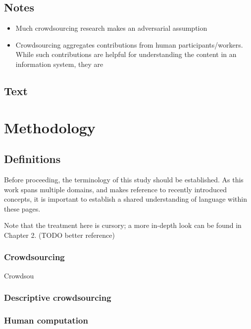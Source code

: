 \subsection{Notes}\label{notes-2}

\begin{itemize}
\item
  Much crowdsourcing research makes an adversarial assumption
\item
  Crowdsourcing aggregates contributions from human
  participants/workers. While such contributions are helpful for
  understanding the content in an information system, they are
\end{itemize}

\subsection{Text}\label{text}

\section{Methodology}\label{methodology}

\subsection{Definitions}\label{definitions}

Before proceeding, the terminology of this study should be established.
As this work spans multiple domains, and makes reference to recently
introduced concepts, it is important to establish a shared understanding
of language within these pages.

Note that the treatment here is cursory; a more in-depth look can be
found in Chapter 2. (TODO better reference)

\subsubsection{Crowdsourcing}\label{crowdsourcing}

Crowdsou

\subsubsection{Descriptive
crowdsourcing}\label{descriptive-crowdsourcing}

\subsubsection{Human computation}\label{human-computation}

